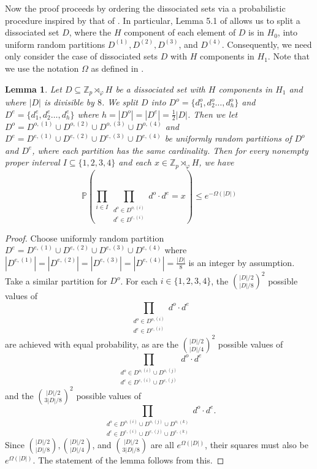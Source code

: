 \documentclass[11pt]{amsart}
\newtheorem{lemma}[theorem]{Lemma}
\theoremstyle{definition}
\begin{document}
Now the proof proceeds by ordering the dissociated sets via a probabilistic procedure inspired by that of \cite{BK}. 
In particular, Lemma 5.1 of \cite{BK} allows us to split a dissociated set $D$, where the $H$ component of each element of $D$ is in $H_0$, into uniform random partitions $D^{(1)}, D^{(2)}, D^{(3)}$, and $D^{(4)}$. Consequently, we need only consider the case of dissociated sets $D$ with $H$ components in $H_1$. Note that we use the notation $\Omega$ as defined in \cite{BK}.

\begin{lemma} \label{lem: adapt-5.1}
Let $D \subseteq \mathbb{Z}_{p} \rtimes_{\varphi} H$ be a dissociated set  with $H$ components in $H_1$ and where $|D|$ is divisible by $8$. We split $D$ into $D^o=\{d_1^o,d_2^o\dots,d_h^o\}$ and $D^e=\{d_1^e,d_2^e\dots,d_h^e\}$ where $h=|D^o|=|D^e| = \frac{1}{2} |D|$. Then we let $D^o = D^{o,(1)} \cup D^{o,(2)} \cup D^{o,(3)} \cup D^{o,(4)}$ and $D^e = D^{e,(1)} \cup D^{e,(2)} \cup D^{e,(3)} \cup D^{e,(4)}$ be uniformly random partitions of $D^o$ and $D^e$, where each partition has the same cardinality. Then for every nonempty proper interval $I \subseteq \{1,2,3,4\}$ and each $x \in \mathbb{Z}_{p} \rtimes_{\varphi} H$, we have 
$$\mathbb{P} \left(\prod_{i \in I} \prod_{\substack{d^o \in D^{o,(i)} \\ d^e \in D^{e,(i)}}} d^o \cdot d^e  = x \right) \leq e^{-\Omega(|D|)}$$
\end{lemma}
\begin{proof}
Choose uniformly random partition $D^e = D^{e,(1)} \cup D^{e,(2)} \cup D^{e,(3)} \cup D^{e,(4)}$ where $|D^{e,(1)}| = |D^{e,(2)}| = |D^{e,(3)}| = |D^{e,(4)}| = \frac{|D|}{8}$ is an integer by assumption. Take a similar partition for $D^o$. For each $i \in \{1,2,3,4\}$, the $\binom{|D|/2}{|D|/8}^2$
possible values of $$\prod_{\substack{d^o \in D^{o,(i)} \\ d^e \in D^{e,(i)}}} d^o \cdot d^e $$ are achieved with equal probability, as are the $\binom{|D|/2}{|D|/4}^2$
possible values of $$\prod_{\substack{d^o \in D^{o,(i)} \cup D^{o,(j)} \\ d^e \in D^{e,(i)} \cup D^{e,(j)}}} d^o \cdot d^e$$ and the $\binom{|D|/2}{3|D|/8}^2$ possible values of $$\prod_{\substack{d^o \in D^{o,(i)} \cup D^{o,(j)} \cup D^{o, (k)} \\ d^e \in D^{e,(i)} \cup D^{e,(j)} \cup D^{e, (k)}}} d^o \cdot d^e.$$
Since $\binom{|D|/2}{|D|/8}, \binom{|D|/2}{|D|/4}$, and $\binom{|D|/2}{3|D|/8}$ are all $e^{\Omega(|D|)}$, their squares must also be $e^{\Omega(|D|)}$. The statement of the lemma follows from this.
\end{proof}
\end{document}
